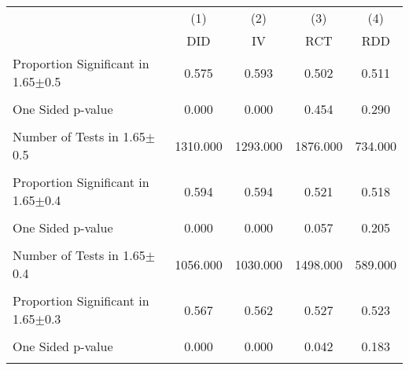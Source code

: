 {
\def\sym#1{\ifmmode^{#1}\else\(^{#1}\)\fi}
\begin{tabular}{l*{4}{c}}
\hline\hline
                &\multicolumn{1}{c}{(1)}&\multicolumn{1}{c}{(2)}&\multicolumn{1}{c}{(3)}&\multicolumn{1}{c}{(4)}\\
                &\multicolumn{1}{c}{DID}&\multicolumn{1}{c}{IV}&\multicolumn{1}{c}{RCT}&\multicolumn{1}{c}{RDD}\\
\hline
\hline Proportion Significant in 1.65$\pm$0.5&    0.575         &    0.593         &    0.502         &    0.511         \\
                &                  &                  &                  &                  \\
One Sided p-value&    0.000         &    0.000         &    0.454         &    0.290         \\
                &                  &                  &                  &                  \\
Number of Tests in 1.65$\pm$0.5& 1310.000         & 1293.000         & 1876.000         &  734.000         \\
                &                  &                  &                  &                  \\
\hline Proportion Significant in 1.65$\pm$0.4&    0.594         &    0.594         &    0.521         &    0.518         \\
                &                  &                  &                  &                  \\
One Sided p-value&    0.000         &    0.000         &    0.057         &    0.205         \\
                &                  &                  &                  &                  \\
Number of Tests in 1.65$\pm$0.4& 1056.000         & 1030.000         & 1498.000         &  589.000         \\
                &                  &                  &                  &                  \\
\hline Proportion Significant in 1.65$\pm$0.3&    0.567         &    0.562         &    0.527         &    0.523         \\
                &                  &                  &                  &                  \\
One Sided p-value&    0.000         &    0.000         &    0.042         &    0.183         \\
                &                  &                  &                  &                  \\

\end{tabular}}
